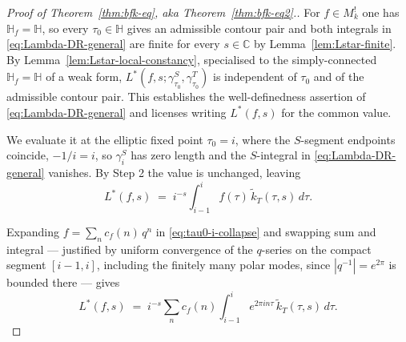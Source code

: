\documentclass[11pt]{article}
\numberwithin{equation}{section}  %
\newcommand{\HH}{\mathbb{H}}
\newcommand{\CC}{\mathbb{C}}
\begin{document}
\begin{proof}[Proof of Theorem~\ref{thm:bfk-eq}, aka Theorem~\ref{thm:bfk-eq2}.]
For $f \in M^!_k$ one has $\HH_f = \HH$, so every $\tau_0 \in \HH$
gives an admissible contour pair and both integrals in
\eqref{eq:Lambda-DR-general} are finite for every
$s \in \CC$ by Lemma~\ref{lem:Lstar-finite}.  By
Lemma~\ref{lem:Lstar-local-constancy}, specialised to the
simply-connected $\HH_f = \HH$ of a weak form,
$L^*(f, s; \gamma^S_{\tau_0}, \gamma^T_{\tau_0})$ is independent of
$\tau_0$ and of the admissible contour pair.  This establishes the
well-definedness assertion of \eqref{eq:Lambda-DR-general}
and licenses writing $L^*(f, s)$ for the common value.

We evaluate it at the elliptic fixed point $\tau_0 = i$, where the
$S$-segment endpoints
coincide, $-1/i = i$, so $\gamma^S_i$ has zero length and the
$S$-integral in \eqref{eq:Lambda-DR-general} vanishes.  By
Step 2 the value is unchanged, leaving
\begin{equation}\label{eq:tau0-i-collapse}
  L^*(f, s)
  \;=\; i^{-s}\!\int_{i - 1}^{i}\! f(\tau)\,\widetilde{k}_T(\tau, s)\,d\tau.
\end{equation}

Expanding $f = \sum_n c_f(n)\,q^n$ in \eqref{eq:tau0-i-collapse} and
swapping sum and integral --- justified by uniform convergence of the
$q$-series on the compact segment $[i - 1, i]$, including the finitely
many polar modes, since $|q^{-1}| = e^{2\pi}$ is bounded there ---
gives
\begin{equation}\label{eq:per-mode-tau0-i}
  L^*(f, s)
  \;=\; i^{-s}\!\sum_n\! c_f(n)\!\int_{i - 1}^{i}\! e^{2\pi i n \tau}\,
  \widetilde{k}_T(\tau, s)\,d\tau.
\end{equation}


\end{proof}
\end{document}
